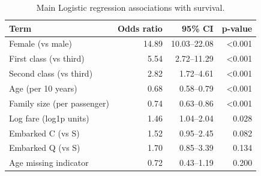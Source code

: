 \begin{table}[htbp]
\centering
\caption{Main Logistic regression associations with survival.}
\label{tab:logit-main}
\small
\begin{tabular}{lrrr}
\toprule
Term & Odds ratio & 95\% CI & p-value \\
\midrule
Female (vs male) & 14.89 & 10.03--22.08 & <0.001 \\
First class (vs third) & 5.54 & 2.72--11.29 & <0.001 \\
Second class (vs third) & 2.82 & 1.72--4.61 & <0.001 \\
Age (per 10 years) & 0.68 & 0.58--0.79 & <0.001 \\
Family size (per passenger) & 0.74 & 0.63--0.86 & <0.001 \\
Log fare (log1p units) & 1.46 & 1.04--2.04 & 0.028 \\
Embarked C (vs S) & 1.52 & 0.95--2.45 & 0.082 \\
Embarked Q (vs S) & 1.70 & 0.85--3.39 & 0.134 \\
Age missing indicator & 0.72 & 0.43--1.19 & 0.200 \\
\bottomrule
\end{tabular}
\end{table}
